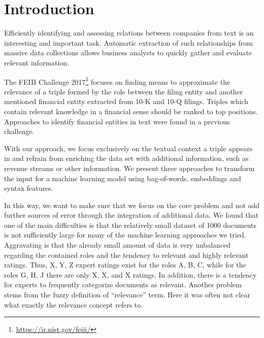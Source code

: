 \section{Introduction}



Efficiently identifying and assessing relations between companies from text is an interesting and important task.
Automatic extraction of such relationships from massive data collections allows business analysts to quickly gather and evaluate relevant information.

The FEIII Challenge 2017\footnote{\url{https://ir.nist.gov/feiii/}} focuses on finding means to approximate the relevance of a triple formed by the role between the filing entity and another mentioned financial entity extracted from 10-K and 10-Q filings.
Triples which contain relevant knowledge in a financial sense should be ranked to top positions.
Approaches to identify financial entities in text were found in a previous challenge\cite{Samiei:2016:CRT:2951894.2951905}.

With our approach, we focus exclusively on the textual context a triple appears in and refrain from enriching the data set with additional information, such as revenue streams or other information.
We present three approaches to transform the input for a machine learning model using bag-of-words, embeddings and syntax features.





In this way, we want to make sure that we focus on the core problem and not add further sources of error through the integration of additional data.
We found that one of the main difficulties is that the relatively small dataset of 1000 documents is not sufficiently large for many of the machine learning approaches we tried. 
Aggravating is that the already small amount of data is very unbalanced regarding the contained roles and the tendency to relevant and highly relevant ratings.
Thus, X, Y, Z expert ratings exist for the roles A, B, C, while for the roles G, H, J there are only X, X, and X ratings.  
In addition, there is a tendency for experts to frequently categorize documents as relevant.
Another problem stems from the fuzzy definition of ``relevance'' term.
Here it was often not clear what exactly the relevance concept refers to.

